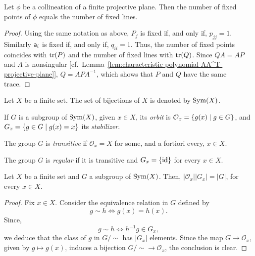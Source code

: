 \begin{cor}\label{cor:fixed-points-equals-fixed-lines}
    Let\/ $\phi$ be a collineation of a finite projective plane. Then the number of fixed points of\/ $\phi$ equals the number of fixed lines.
\end{cor}

\begin{proof}
    Using the same notation as above, $P_j$ is fixed if, and only if, $p_{jj}=1$. Similarly $\mathsf a_i$ is fixed if, and only if, $q_{ii}=1$. Thus, the number of fixed points coincides with $\operatorname{tr}(P)$ and the number of fixed lines with $\operatorname{tr}(Q)$. Since $QA=AP$ and $A$ is nonsingular [cf.~Lemma~\ref{lem:characteristic-polynomial-AA^T-projective-plane}], $Q=APA^{-1}$, which shows that $P$ and $Q$ have the same trace.
    
\end{proof}

\begin{ntn}\label{ntn:orbits-etc}
    Let\/ $X$ be a finite set. The set of bijections of\/ $X$ is denoted by\/ ${\rm Sym}(X)$.
    
    If\/ $G$ is a subgroup of\/ ${\rm Sym}(X)$, given\/ $x\in X$, its \textsl{orbit} is\/ $\mathcal O_x=\{g(x)\mid g\in G\}$, and\/ $G_x=\{g\in G\mid g(x)=x\}$ its \textsl{stabilizer}.

    The group\/ $G$ is \textsl{transitive} if\/ $\mathcal O_x=X$ for some, and a fortiori every, $x\in X$.

    The group\/ $G$ is \textsl{regular} if it is transitive and\/ $G_x=\{\operatorname{id}\}$ for every\/ $x\in X$.
\end{ntn}

\begin{lem}\label{lem:fundamental-counting-principle}
    Let\/ $X$ be a finite set and\/ $G$ a subgroup of\/ ${\rm Sym}(X)$. Then, $|\mathcal O_x||G_x|=|G|$, for every\/ $x\in X$.
\end{lem}

\begin{proof}\citep[Fundamental Counting Principle]{LC-Groups}
    Fix $x\in X$. Consider the equivalence relation in $G$ defined by
    $$
        g\sim h\iff g(x)=h(x).
    $$
    Since,
    $$
        g\sim h\iff h^{-1}g\in G_x,
    $$
    we deduce that the class of $g$ in $G/{\sim}$ has $|G_x|$ elements. Since the map $G\to\mathcal O_x$, given by $g\mapsto g(x)$, induces a bijection $G/{\sim}\to\mathcal O_x$, the conclusion is clear.
\end{proof}

